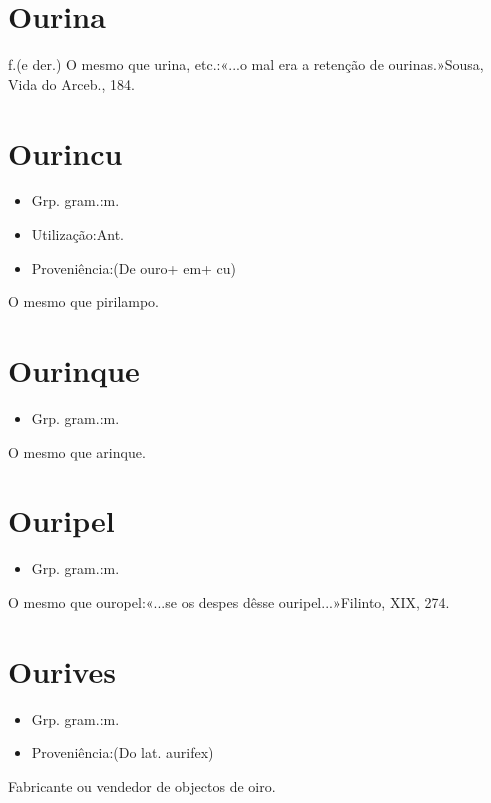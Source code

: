 \section{Ourina}
\textunderscore f.\textunderscore  (e der.)
O mesmo que \textunderscore urina\textunderscore , etc.:«\textunderscore ...o mal era a retenção de ourinas.\textunderscore »Sousa, \textunderscore Vida do Arceb.\textunderscore , 184.
\section{Ourincu}
\begin{itemize}
\item {Grp. gram.:m.}
\end{itemize}
\begin{itemize}
\item {Utilização:Ant.}
\end{itemize}
\begin{itemize}
\item {Proveniência:(De \textunderscore ouro\textunderscore  + \textunderscore em\textunderscore  + \textunderscore cu\textunderscore )}
\end{itemize}
O mesmo que \textunderscore pirilampo\textunderscore .
\section{Ourinque}
\begin{itemize}
\item {Grp. gram.:m.}
\end{itemize}
O mesmo que \textunderscore arinque\textunderscore .
\section{Ouripel}
\begin{itemize}
\item {Grp. gram.:m.}
\end{itemize}
O mesmo que \textunderscore ouropel\textunderscore :«\textunderscore ...se os despes dêsse ouripel...\textunderscore »Filinto, XIX, 274.
\section{Ourives}
\begin{itemize}
\item {Grp. gram.:m.}
\end{itemize}
\begin{itemize}
\item {Proveniência:(Do lat. \textunderscore aurifex\textunderscore )}
\end{itemize}
Fabricante ou vendedor de objectos de oiro.
